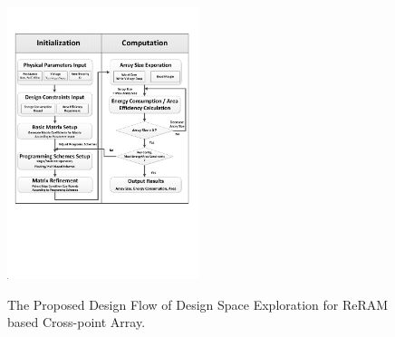 \begin{figure}[!t]
\centering
  \includegraphics[width=0.5\textwidth]{./figures/FlowChart.pdf}\\
  \caption{The Proposed Design Flow of Design Space Exploration for ReRAM based Cross-point Array.}\label{fig:FlowChart}
  \vspace{-10pt}
\end{figure}
